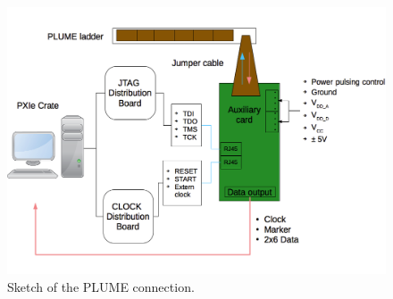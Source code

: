 

  \begin{figure}[!h]
    \centering
    \includegraphics[width=\textwidth]{Pictures/labTests/plumeAux.png}
    \caption{Sketch of the PLUME connection.}
    \label{fig:plumeAux}
  \end{figure}



